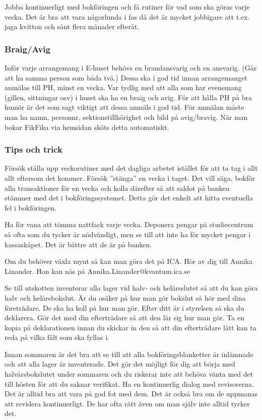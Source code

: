 \documentclass[10pt]{article}
\begin{document}
Jobba kontinuerligt med bokföringen och få rutiner för vad som ska göras varje vecka. Det är bra att vara någorlunda i fas då det är mycket jobbigare att t.ex. jaga kvitton och sånt flera månader efteråt.

\subsubsection{Braig/Avig}
Inför varje arrangemang i E-huset behövs en brandansvarig och en ansvarig. (Går att ha samma person som båda två.) Dessa ska i god tid innan arrangemanget anmälas till PH, minst en vecka. Var tydlig med att alla som har evenemang (gillen, sittningar osv) i huset ska ha en braig och avig. För att hålla PH på bra humör är det som sagt viktigt att dessa anmäls i god tid. För anmälan måste man ha namn, personnr, sektionstillhörighet och bild på avig/bravig. När man bokar FikFika via hemsidan sköts detta automatiskt.

\subsubsection{Tips och trick}
Försök ställa upp veckorutiner med det dagliga arbetet istället för att ta tag i allt allt eftersom det kommer. Försök ”stänga” en vecka i taget. Det vill säga, bokför alla transaktioner för en vecka och kolla därefter så att saldot på banken stämmer med det i bokföringssystemet. Detta gör det enkelt att hitta eventuella fel i bokföringen.

Ha för vana att tömma nattfack varje vecka. Deponera pengar på studiecentrum så ofta som du tycker är nödvändigt, men se till att inte ha för mycket pengar i kassaskåpet. Det är bättre att de är på banken.

Om du behöver växla mynt så kan man göra det på ICA. Hör av dig till Annika Linander. Hon kan nås på Annika.Linander@kvantum.ica.se

Se till utskotten inventerar alla lager vid halv- och helårsslutet så att du kan göra halv och helårsbokslut. Är du osäker på hur man gör bokslut så hör med dina företrädare. De ska ha koll på hur man gör. Efter ditt år i styrelsen så ska du deklarera. Gör det med din efterträdare så att den lär sig hur man gör. Ta en kopia på deklarationen innan du skickar in den så att din efterträdare lätt kan ta reda på vilka fält som ska fyllas i.

Innan sommaren är det bra att se till att alla bokföringsblanketter är inlämnade och att alla lager är inventerade. Det gör det möjligt för dig att börja med halvårsbokslutet under sommaren och du riskerar inte att behöva vänta med det till hösten för att du saknar verifikat.
Ha en kontinuerlig dialog med revisorerna. Det är alltid bra att vara på god fot med dem. Det är också bra om de uppmanas att revidera kontinuerligt. De har ofta rätt även om man själv inte alltid tycker det.
\end{document}
